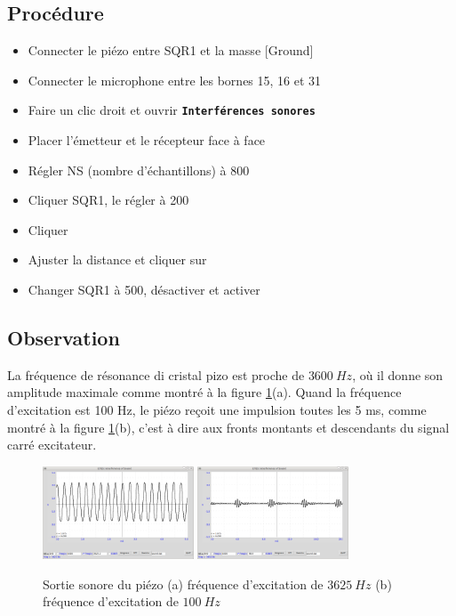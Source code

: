 \documentclass{book}
\newcommand{\nop}{}
\begin{document}
\subsection{Procédure}


\begin{itemize}
  \item Connecter le piézo entre SQR1 et la masse [Ground]
  \item Connecter le microphone entre les bornes 15, 16 et 31
  \item Faire un clic droit et ouvrir  \texttt{\textbf{Interférences sonores}\nop}
  \item Placer l'émetteur et le récepteur face à face
  \item Régler NS (nombre d'échantillons) à 800
  \item Cliquer SQR1, le régler à 200
  \item Cliquer  
  \item Ajuster la distance et cliquer sur  
  \item Changer SQR1 à 500, désactiver et activer  
\end{itemize}

\subsection{Observation}


La fréquence de résonance di cristal pizo est proche de $3600\ Hz$, où il donne son amplitude maximale comme montré à la figure  \ref{fig:Piezo-Sound-output}(a). Quand la fréquence d'excitation est 100 Hz, le piézo reçoit une impulsion toutes les 5 ms, comme montré à la figure  \ref{fig:Piezo-Sound-output}(b), c'est à dire aux fronts montants et descendants du signal carré excitateur.
\begin{figure}[h!]
\begin{center}
\caption{\label{fig:Piezo-Sound-output}Sortie sonore du piézo (a) fréquence d'excitation de $3625\ Hz$ (b) fréquence d'excitation de $100\ Hz$ }\vspace{0.5em}
\includegraphics[width=0.4\textwidth, height=0.3\textwidth, keepaspectratio]{Schematic-piezo-3600hz.png}
\includegraphics[width=0.4\textwidth, height=0.3\textwidth, keepaspectratio]{Pic-piezo-100hz.png}
\end{center}
\end{figure}
\end{document}
